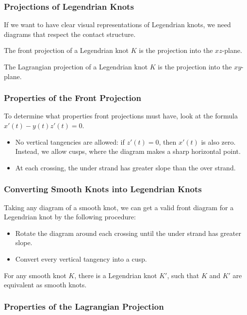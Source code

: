 \documentclass{beamer}
\begin{document}
\begin{frame}
    \frametitle{Projections of Legendrian Knots}
    If we want to have clear visual representations of Legendrian knots,
    we need diagrams that respect the contact structure.

    \begin{definition}
    The \alert{front projection} of a Legendrian knot $K$ is the projection
    into the $xz$-plane.
    \end{definition}

    \begin{definition}
    The \alert{Lagrangian projection} of a Legendrian knot $K$ is the projection
    into the $xy$-plane.
    \end{definition}
\end{frame}

\begin{frame}
    \frametitle{Properties of the Front Projection}
    To determine what properties front projections must have, look at the
    formula $x'(t) - y(t)z'(t) = 0$.
    \begin{itemize}
    \item No vertical tangencies are allowed: if $z'(t) = 0$, then $x'(t)$ is also zero.
    Instead, we allow \alert{cusps}, where the diagram makes a sharp horizontal point.
    \item At each crossing, the under strand has greater slope than the over strand.
    \end{itemize}
\end{frame}

\begin{frame}
    \frametitle{Converting Smooth Knots into Legendrian Knots}
    Taking any diagram of a smooth knot, we can get a valid front diagram for a Legendrian
    knot by the following procedure:
    \begin{itemize}
    \item Rotate the diagram around each crossing until the under strand has greater slope.
    \item Convert every vertical tangency into a cusp.
    \end{itemize}
    \begin{theorem}
        For any smooth knot $K$, there is a Legendrian knot $K'$, such that $K$ and $K'$ are
        equivalent as smooth knots.
    \end{theorem}
\end{frame}

\begin{frame}
\frametitle{Properties of the Lagrangian Projection}
\end{frame}
\end{document}
